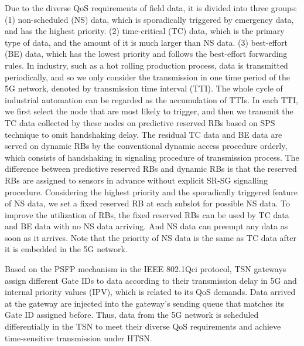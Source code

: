 \documentclass{SCIS2021}
\begin{document}
	\par Due to the diverse QoS requirements of field data, it is divided into three groups: (1) non-scheduled (NS) data, which is sporadically triggered by emergency data, and has the highest priority. (2) time-critical (TC) data, which is the primary type of data, and the amount of it is much larger than NS data. (3) best-effort (BE) data, which has the lowest priority and follows the best-effort forwarding rules. In industry, such as a hot rolling production process, data is transmitted periodically, and so we only consider the transmission in one time period of the 5G network, denoted by transmission time interval (TTI). The whole cycle of industrial automation can be regarded as the accumulation of TTIs. {\color{blue}In each TTI, we first select the node that are most likely to trigger, and then we transmit the TC data collected by these nodes on predictive reserved RBs based on SPS technique to omit handshaking delay. The residual TC data and BE data are served on dynamic RBs by the conventional dynamic access procedure orderly, which consists of handshaking in signaling procedure of transmission process. The difference between predictive reserved RBs and dynamic RBs is that the reserved RBs are assigned to sensors in advance without explicit SR-SG signalling procedure.} Considering the highest priority and the sporadically triggered feature of NS data, we set a fixed reserved RB at each subslot for possible NS data. To improve the utilization of RBs, the fixed reserved RBs can be used by TC data and BE data with no NS data arriving. And NS data can preempt any data as soon as it arrives. Note that the priority of NS data is the same as TC data after it is embedded in the 5G network. 
	
	\par {\color{black}Based on the PSFP mechanism in the IEEE 802.1Qci protocol, TSN gateways assign different Gate IDs to data according to their transmission delay in 5G and internal priority values (IPV), which is related to its QoS demands. Data arrived at the gateway are injected into the gateway's sending queue that matches its Gate ID assigned before. 
	Thus, data from the 5G network is scheduled differentially in the TSN to meet their diverse QoS requirements and achieve time-sensitive transmission under HTSN.}
	
\end{document}
